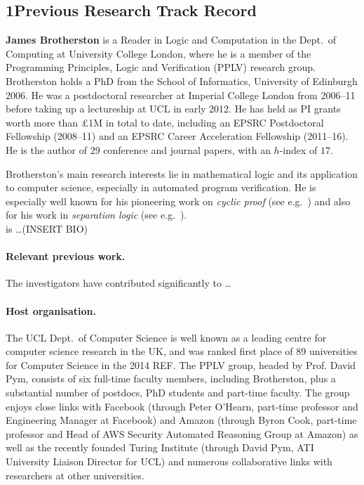 \documentclass[11pt,twocolumn]{article}
\begin{document}


\begin{abstract}
  
\end{abstract}

\subsection*{1\quad Previous Research Track Record}

{\bf James Brotherston} is a Reader in Logic and Computation in the Dept.\ of Computing at University College London, where he is a member of the Programming Principles, Logic and Verification (PPLV) research group.  Brotherston holds a PhD from the School of Informatics, University of Edinburgh 2006.  He was a postdoctoral researcher at Imperial College London from 2006--11 before taking up a lectureship at UCL in early 2012. He has held as PI grants worth more than $\pounds$1M in total to date, including an EPSRC Postdoctoral Fellowship (2008--11) and an EPSRC Career Acceleration Fellowship (2011--16). He is the author of 29 conference and journal papers, with an $h$-index of $17$.

Brotherston's main research interests lie in mathematical logic and its application to computer science, especially in automated program verification. He is especially well known for his pioneering work on \emph{cyclic proof} (see e.g.~) and also for his work in \emph{separation logic} (see e.g.~).  \\

 is \ldots (INSERT BIO)

\paragraph{Relevant previous work.}
The investigators have contributed significantly to \ldots 

\paragraph{Host organisation.}
The UCL Dept.\ of Computer Science is well known as a leading centre for computer science research in the UK, and was ranked first place of 89 universities for Computer Science in the 2014 REF. The PPLV group, headed by Prof. David Pym, consists of six full-time faculty members, including Brotherston, plus a substantial number of postdocs, PhD students and part-time faculty. The group enjoys close links with Facebook (through Peter O'Hearn, part-time professor and Engineering Manager at Facebook) and Amazon (through Byron Cook, part-time professor and Head of AWS Security Automated Reasoning Group at Amazon) as well as the recently founded Turing Institute (through David Pym, ATI University Liaison Director for UCL) and numerous collaborative links with researchers at other universities.
\end{document}
